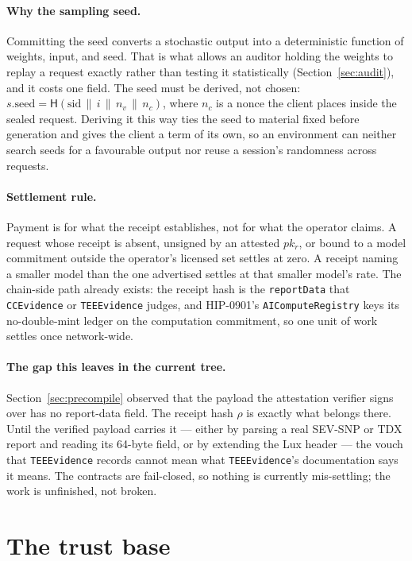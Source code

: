 \documentclass[11pt]{article}
\newcommand{\code}[1]{\texttt{#1}}
\begin{document}
\paragraph{Why the sampling seed.}
Committing the seed converts a stochastic output into a deterministic function of weights, input,
and seed. That is what allows an auditor holding the weights to replay a request exactly rather than
testing it statistically (Section~\ref{sec:audit}), and it costs one field. The seed must be
derived, not chosen: $s.\mathrm{seed} = \mathsf{H}(\mathrm{sid} \,\|\, i \,\|\, n_v \,\|\, n_c)$,
where $n_c$ is a nonce the client places inside the sealed request. Deriving it this way ties the
seed to material fixed before generation and gives the client a term of its own, so an environment
can neither search seeds for a favourable output nor reuse a session's randomness across requests.

\paragraph{Settlement rule.}
Payment is for what the receipt establishes, not for what the operator claims. A request whose
receipt is absent, unsigned by an attested $pk_r$, or bound to a model commitment outside the
operator's licensed set settles at zero. A receipt naming a smaller model than the one advertised
settles at that smaller model's rate. The chain-side path already exists: the receipt hash is the
\code{reportData} that \code{CCEvidence} or \code{TEEEvidence} judges, and HIP-0901's
\code{AIComputeRegistry} keys its no-double-mint ledger on the computation commitment, so one unit
of work settles once network-wide.

\paragraph{The gap this leaves in the current tree.}
Section~\ref{sec:precompile} observed that the payload the attestation verifier signs over has no
report-data field. The receipt hash $\rho$ is exactly what belongs there. Until the verified payload
carries it --- either by parsing a real SEV-SNP or TDX report and reading its 64-byte field, or by
extending the Lux header --- the vouch that \code{TEEEvidence} records cannot mean what
\code{TEEEvidence}'s documentation says it means. The contracts are fail-closed, so nothing is
currently mis-settling; the work is unfinished, not broken.

\section{The trust base}
\label{sec:trust}
\end{document}
